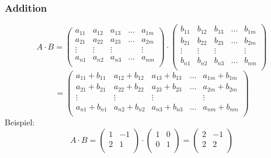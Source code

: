 \subsubsection{Addition}
\[ A \cdot B =
  \begin {pmatrix}
    a_{11} & a_{12} & a_{13} & \hdots & a_{1m} \\
    a_{21} & a_{22} & a_{23} & \hdots & a_{2m} \\
    \vdots  & \vdots  & \vdots  &        & \vdots  \\
    a_{n1} & a_{n2} & a_{n3} & \hdots & a_{nm} \\
  \end {pmatrix} \cdot 
  \begin {pmatrix}
    b_{11} & b_{12} & b_{13} & \hdots & b_{1m} \\
    b_{21} & b_{22} & b_{23} & \hdots & b_{2m} \\
    \vdots  & \vdots  & \vdots  &        & \vdots  \\
    b_{n1} & b_{n2} & b_{n3} & \hdots & b_{nm} \\
  \end {pmatrix} \]
\[ = \begin {pmatrix}
    a_{11} + b_{11} & a_{12} + b_{12} & a_{13} + b_{13} & \hdots &
      a_{1m} + b_{1m} \\
    a_{21} + b_{21} & a_{22} + b_{22} & a_{23} + b_{23} & \hdots &
      a_{2m} + b_{2m} \\
    \vdots  & \vdots  & \vdots  &        & \vdots  \\
    a_{n1} + b_{n1} & a_{n2} + b_{n2} & a_{n3} + b_{n3} & \hdots &
    a_{nm} + b_{nm} \\
  \end {pmatrix} \]
Beispiel:
\[ A \cdot B =
  \begin {pmatrix} 1 & -1 \\ 2 & 1 \\ \end {pmatrix} \cdot
  \begin {pmatrix} 1 & 0 \\ 0 & 1 \\ \end {pmatrix} =
  \begin {pmatrix} 2 & -1 \\ 2 & 2 \\ \end {pmatrix} 
\]

